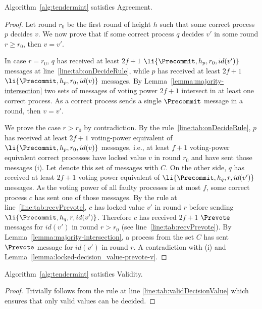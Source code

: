 \begin{lemma} \label{lemma:agreement} Algorithm~\ref{alg:tendermint} satisfies
Agreement.  \end{lemma}

\begin{proof} Let round $r_0$ be the first round of height $h$ such that some
    correct process $p$ decides $v$. We now prove that if some correct process
    $q$ decides $v'$ in some round $r \ge r_0$, then $v = v'$.

In case $r = r_0$, $q$ has received at least $2f+1$
$\li{\Precommit,h_p,r_0,id(v')}$  messages at line~\ref{line:tab:onDecideRule},
while $p$ has received at least $2f+1$ $\li{\Precommit,h_p,r_0,id(v)}$
messages.  By Lemma~\ref{lemma:majority-intersection} two sets of messages of
voting power $2f+1$ intersect in at least one correct process.  As a correct
process sends a single $\Precommit$ message in a round, then $v=v'$.

We prove the case $r > r_0$ by contradiction. By the
rule~\ref{line:tab:onDecideRule}, $p$ has received at least $2f+1$ voting-power
equivalent of $\li{\Precommit,h_p,r_0,id(v)}$ messages, i.e., at least $f+1$
voting-power equivalent correct processes have locked value $v$ in round $r_0$ and have
sent those messages (i). Let denote this set of messages with $C$.  On the
other side, $q$ has received at least $2f+1$ voting power equivalent of
$\li{\Precommit,h_q, r,id(v')}$ messages. As the voting power of all faulty
processes is at most $f$, some correct process $c$ has sent one of those
messages. By the rule at line~\ref{line:tab:recvPrevote}, $c$ has locked value
$v'$ in round $r$ before sending $\li{\Precommit,h_q, r,id(v')}$. Therefore $c$
has received $2f+1$ $\Prevote$ messages for $id(v')$ in round $r > r_0$ (see
line~\ref{line:tab:recvPrevote}). By Lemma~\ref{lemma:majority-intersection}, a
process from the set $C$ has sent $\Prevote$ message for $id(v')$ in round $r$.
A contradiction with (i) and Lemma~\ref{lemma:locked-decision_value-prevote-v}.
\end{proof}	

\begin{lemma} \label{lemma:agreement} Algorithm~\ref{alg:tendermint} satisfies
Validity.  \end{lemma}

\begin{proof} Trivially follows from the rule at line
\ref{line:tab:validDecisionValue} which ensures that only valid values can be
decided.  \end{proof}	

